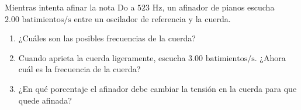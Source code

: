 \item Mientras intenta afinar la nota Do a $523\text{ Hz}$, un afinador de pianos escucha $2.00\text{ batimientos/s}$ entre un oscilador de referencia y la cuerda.
\begin{enumerate}
    \item ¿Cuáles son las posibles frecuencias de la cuerda?
    \item Cuando aprieta la cuerda ligeramente, escucha $3.00\text{ batimientos/s}$. ¿Ahora cuál es la frecuencia de la cuerda?
    \item ¿En qué porcentaje el afinador debe cambiar la tensión en la cuerda para que quede afinada?
\end{enumerate}